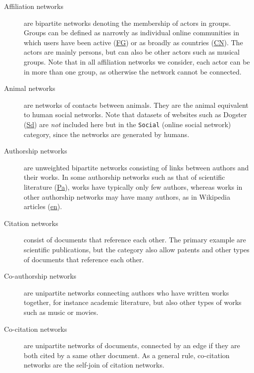 \documentclass{article}
\begin{document}
\begin{description}
\item[Affiliation networks] are bipartite networks denoting the
  membership of actors in groups.  Groups can be defined as narrowly as
  individual online communities in which users have been active
  (\href{http://konect.cc/networks/flickr-groupmemberships/}{\textsf{FG}})
  or as broadly as countries
  (\href{http://konect.cc/networks/dbpedia-country/}{\textsf{CN}}). The
  actors are mainly persons, but can also be other actors such as musical
  groups. Note that in all affiliation networks we consider, each actor
  can be in more than one group, as otherwise the network cannot be
  connected.

\item[Animal networks] are networks of contacts between animals.  
  They are the animal equivalent to human social networks.  Note that
  datasets of websites such as Dogster
  (\href{http://konect.cc/networks/petster-friendships-dog/}{\textsf{Sd}})
  are \emph{not} included here but in the \texttt{Social} (online social
  network) category, since the networks are generated by humans. 

\item[Authorship networks] are unweighted bipartite networks consisting
  of links between authors and their works.  In some authorship networks
  such as that of scientific literature
  (\href{http://konect.cc/networks/dblp-author/}{\textsf{Pa}}),
  works have typically only few authors, whereas works in other
  authorship networks may have many authors, as in Wikipedia articles
    (\href{http://konect.cc/networks/edit-enwiki/}{\textsf{en}}).

\item[Citation networks] consist of documents that reference each
  other.  The primary example are scientific publications, but the
  category also allow patents and other types of documents that
  reference each other. 

\item[Co-authorship networks] are unipartite networks connecting authors
  who have written works together, for instance academic literature, but
  also other types of works such as music or movies. 

\item[Co-citation networks] are unipartite networks of documents,
  connected by an edge if they are both cited by a same other document.
  As a general rule, co-citation networks are the self-join of citation
  networks. 
  

\end{description}
\end{document}
